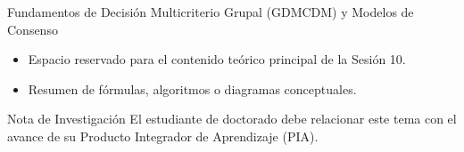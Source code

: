 \documentclass[aspectratio=169, 10pt]{beamer}
\begin{document}
\begin{frame}{Fundamentos de Decisión Multicriterio Grupal (GDMCDM) y Modelos de Consenso}
    \begin{itemize}
        \item Espacio reservado para el contenido teórico principal de la Sesión 10.
        \item Resumen de fórmulas, algoritmos o diagramas conceptuales.
    \end{itemize}
    \begin{block}{Nota de Investigación}
        El estudiante de doctorado debe relacionar este tema con el avance de su Producto Integrador de Aprendizaje (PIA).
    \end{block}
\end{frame}
\end{document}
